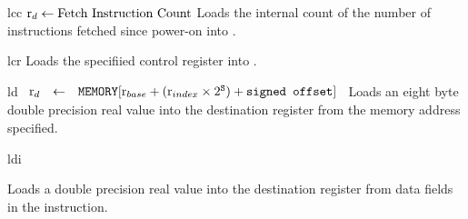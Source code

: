 \begin{instruction}{lcc}
     {\sreglccopc}
     {$\textrm{r}_{d} \leftarrow \textrm{Fetch Instruction Count}$}
     {Loads the internal count of the number of instructions fetched
       since power-on into \dr.}{\dr}
\end{instruction}


\begin{instruction}{lcr}\label{inst:lcr}
     {
       Loads the specifiied control register into \dr.
     }
\end{instruction}


\begin{instruction}{ld}
     {\ldopc}
     {
       \begin{math}
         \begin{array}{lcl}
           {\ensuremath{\textrm{r}_{d}}} & \leftarrow & \texttt{MEMORY}[\textrm{r}_{base} + (\textrm{r}_{index} \times 2^{\texttt{S}}) + \texttt{signed offset}] \\
         \end{array}
       \end{math}
     }
     {
       Loads an eight byte double precision real value
       into the destination register from the memory
       address specified.
     }
\end{instruction}


\begin{instruction}{ldi}
     {\ldiopc}
     {

       Loads a double precision real value into the destination
       register from data fields in the instruction.

     }
\end{instruction}


